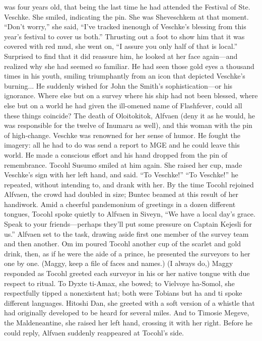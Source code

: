 \documentclass[9pt]{article}
\begin{document}
was four years old, that being the last time he had attended the Festival of Ste. Veschke. She smiled,
indicating the pin. She was Sheveschkem at that moment. “Don’t worry,” she said, “I’ve tracked inenough of Veschke’s blessing from this year’s festival to cover us both.” Thrusting out a foot to show him
that it was covered with red mud, she went on, “I assure you only half of that is local.”
Surprised to find that it did reassure him, he looked at her face again—and realized why she had
seemed so familiar. He had seen those gold eyes a thousand times in his youth, smiling triumphantly from
an icon that depicted Veschke’s burning...
He suddenly wished for John the Smith’s sophistication—or his ignorance.
Where else but on a survey where his ship had not been blessed, where else but on a world he had
given the ill-omened name of Flashfever, could all these things coincide? The death of Oloitokitok,
Alfvaen (deny it as he would, he was responsible for the twelve of Inumaru as well), and this woman with
the pin of high-change. Veschke was renowned for her sense of humor.
He fought the imagery: all he had to do was send a report to MGE and he could leave this world. He
made a conscious effort and his hand dropped from the pin of remembrance.
Tocohl Susumo smiled at him again. She raised her cup, made Veschke’s sign with her left hand, and
said. “To Veschke!”
“To Veschke!” he repeated, without intending to, and drank with her.
By the time Tocohl rejoined Alfvaen, the crowd had doubled in size; Buntec beamed at this result of
her handiwork. Amid a cheerful pandemonium of greetings in a dozen different tongues, Tocohl spoke
quietly to Alfvaen in Siveyn, “We have a local day’s grace. Speak to your friends—perhaps they’ll put
some pressure on Captain Kejesli for us.” Alfvaen set to the task, drawing aside first one member of the
survey team and then another.
Om im poured Tocohl another cup of the scarlet and gold drink, then, as if he were the aide of a
prince, he presented the surveyors to her one by one.
(Maggy, keep a file of faces and names.)
(I always do,) Maggy responded as Tocohl greeted each surveyor in his or her native tongue with
due respect to ritual. To Dyxte ti-Amax, she bowed; to Vielvoye ha-Somol, she respectfully tipped a
nonexistent hat; both were Tobians but ha and ti spoke different languages. Hitoshi Dan, she greeted
with a soft version of a whistle that had originally developed to be heard for several miles. And to
Timosie Megeve, the Maldeneantine, she raised her left hand, crossing it with her right. Before he could
reply, Alfvaen suddenly reappeared at Tocohl’s side.
\end{document}
